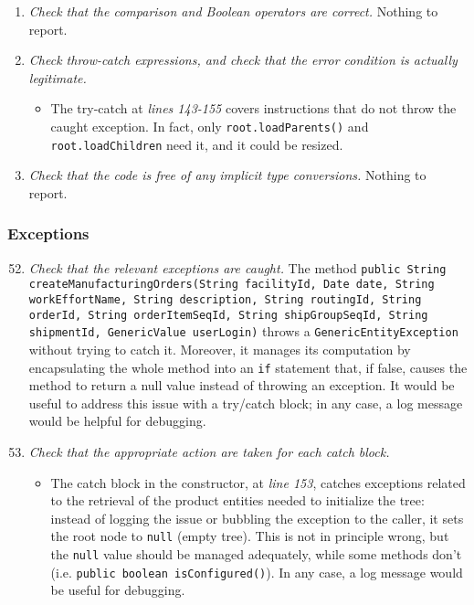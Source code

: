 \begin{enumerate}
			\item \textit{Check that the comparison and Boolean operators are correct.}\newline
			Nothing to report. %

			\item \textit{Check throw-catch expressions, and check that the error condition is actually legitimate.}
			\begin{itemize}
				\item The try-catch at \textit{lines 143-155} covers instructions that do not throw the caught exception. In fact, only \texttt{root.loadParents()} and \texttt{root.loadChildren} need it, and it could be resized.
			\end{itemize}

			\item \textit{Check that the code is free of any implicit type conversions.}\newline
			Nothing to report. %
		\end{enumerate}

	\subsubsection{Exceptions}
		\begin{enumerate}
			\setcounter{enumi}{51}
			\item \textit{Check that the relevant exceptions are caught.}\newline
			The method \texttt{public String createManufacturingOrders(String facilityId, Date date, String workEffortName, String description, String routingId, String orderId, String orderItemSeqId, String shipGroupSeqId, String shipmentId, GenericValue userLogin)} throws a \texttt{GenericEntityException} without trying to catch it. Moreover, it manages its computation by encapsulating the whole method into an \texttt{if} statement that, if false, causes the method to return a null value instead of throwing an exception. It would be useful to address this issue with a try/catch block; in any case, a log message would be helpful for debugging.

			\item \textit{Check that the appropriate action are taken for each catch block.}
			\begin{itemize}
				\item The catch block in the constructor, at \textit{line 153}, catches exceptions related to the retrieval of the product entities needed to initialize the tree: instead of logging the issue or bubbling the exception to the caller, it sets the root node to \texttt{null} (empty tree). This is not in principle wrong, but the \texttt{null} value should be managed adequately, while some methods don't (i.e. \texttt{public boolean isConfigured()}). In any case, a log message would be useful for debugging.
			\end{itemize}
		\end{enumerate}

